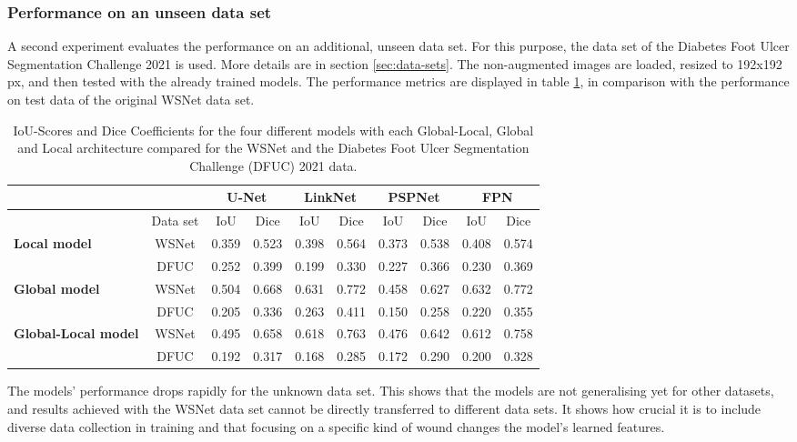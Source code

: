 \subsubsection{Performance on an unseen data set}

A second experiment evaluates the performance on an additional, unseen data set. For this purpose, the data set of the Diabetes Foot Ulcer Segmentation Challenge 2021 \cite{Wang2020} is used. More details are in section \ref{sec:data-sets}. The non-augmented images are loaded, resized to 192x192\,px, and then tested with the already trained models. The performance metrics are displayed in table \ref{table:dataset-comparison}, in comparison with the performance on test data of the original WSNet data set.


\begin{table}[htb!]
	\centering
	\begin{tabular}{l | c ||c | c || c | c || c | c || c | c||}
	& & \multicolumn{2}{|c||}{U-Net} & \multicolumn{2}{|c||}{LinkNet} & \multicolumn{2}{|c||}{PSPNet} & \multicolumn{2}{|c||}{FPN} \\
	\hline
	& Data set & IoU & Dice & IoU & Dice & IoU & Dice & IoU & Dice \\
	\hline\hline
	\multirow{2}{*}{\textbf{Local model}} & WSNet & 0.359 & 0.523 & 0.398 & 0.564 & 0.373 & 0.538 & 0.408 & 0.574 \\
	& DFUC & 0.252 & 0.399 & 0.199 & 0.330 & 0.227 & 0.366 & 0.230 & 0.369\\
	\hline
	\multirow{2}{*}{\textbf{Global model}} & WSNet & 0.504 & 0.668 & 0.631 & 0.772 & 0.458 & 0.627 & 0.632 & 0.772 \\
	& DFUC & 0.205 & 0.336 & 0.263 & 0.411 & 0.150 & 0.258 & 0.220 & 0.355\\
	\hline
	\multirow{2}{*}{\textbf{Global-Local model}} & WSNet & 0.495 & 0.658 & 0.618 & 0.763 & 0.476 & 0.642 & 0.612 & 0.758\\
	& DFUC & 0.192 & 0.317 & 0.168 & 0.285 & 0.172 & 0.290 & 0.200 & 0.328\\
	\end{tabular}
	\caption{IoU-Scores and Dice Coefficients for the four different models with each Global-Local, Global and Local architecture compared for the WSNet and the Diabetes Foot Ulcer Segmentation Challenge (DFUC) 2021 data.}
	\label{table:dataset-comparison}
\end{table}

The models' performance drops rapidly for the unknown data set. This shows that the models are not generalising yet for other datasets, and results achieved with the WSNet data set cannot be directly transferred to different data sets. It shows how crucial it is to include diverse data collection in training and that focusing on a specific kind of wound changes the model's learned features.

